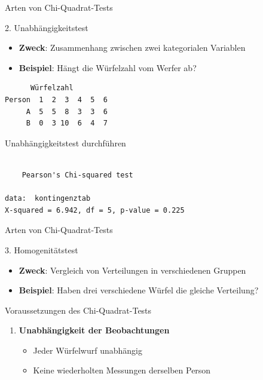 \documentclass[
  ignorenonframetext,
]{beamer}
\providecommand{\tightlist}{%
  \setlength{\itemsep}{0pt}\setlength{\parskip}{0pt}}
\begin{document}
\begin{frame}[fragile]{Arten von Chi-Quadrat-Tests}
\protect{}\label{arten-von-chi-quadrat-tests-1}
\begin{block}{2. Unabhängigkeitstest}
\protect{}\label{unabhuxe4ngigkeitstest}
\begin{itemize}
\tightlist
\item
  \textbf{Zweck}: Zusammenhang zwischen zwei kategorialen Variablen
\item
  \textbf{Beispiel}: Hängt die Würfelzahl vom Werfer ab?
\end{itemize}

\begin{verbatim}
      Würfelzahl
Person  1  2  3  4  5  6
     A  5  5  8  3  3  6
     B  0  3 10  6  4  7
\end{verbatim}
\end{block}
\end{frame}

\begin{frame}[fragile]{Unabhängigkeitstest durchführen}
\protect{}\label{unabhuxe4ngigkeitstest-durchfuxfchren}
\begin{verbatim}

    Pearson's Chi-squared test

data:  kontingenztab
X-squared = 6.942, df = 5, p-value = 0.225
\end{verbatim}
\end{frame}

\begin{frame}{Arten von Chi-Quadrat-Tests}
\protect{}\label{arten-von-chi-quadrat-tests-2}
\begin{block}{3. Homogenitätstest}
\protect{}\label{homogenituxe4tstest}
\begin{itemize}
\tightlist
\item
  \textbf{Zweck}: Vergleich von Verteilungen in verschiedenen Gruppen
\item
  \textbf{Beispiel}: Haben drei verschiedene Würfel die gleiche
  Verteilung?
\end{itemize}
\end{block}
\end{frame}

\begin{frame}{Voraussetzungen des Chi-Quadrat-Tests}
\protect{}\label{voraussetzungen-des-chi-quadrat-tests}
\begin{enumerate}
\tightlist
\item
  \textbf{Unabhängigkeit der Beobachtungen}

  \begin{itemize}
  \tightlist
  \item
    Jeder Würfelwurf unabhängig
  \item
    Keine wiederholten Messungen derselben Person
  \end{itemize}
\end{enumerate}
\end{frame}
\end{document}
